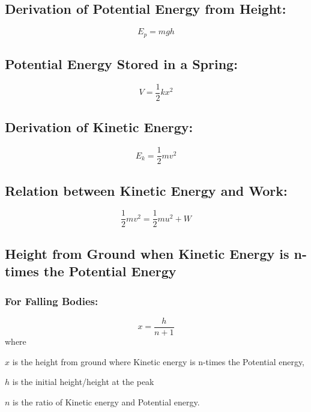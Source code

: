 \documentclass[a4paper]{report}
\begin{document}
        \subsection{Derivation of Potential Energy from Height: }
            \begin{equation}
                E_p = mgh
            \end{equation}
        \subsection{Potential Energy Stored in a Spring: }
            \begin{equation}
                V = \frac{1}{2} kx^2
            \end{equation}
        \subsection{Derivation of Kinetic Energy: }
            \begin{equation}
                E_k = \frac{1}{2}mv^2
            \end{equation}
        \subsection{Relation between Kinetic Energy and Work: }
            \begin{equation}
                \frac{1}{2} mv^2 = \frac{1}{2} mu^2 + W
            \end{equation}
        \subsection{Height from Ground when Kinetic Energy is n-times the Potential Energy}  
            \subsubsection{For Falling Bodies:}
                \begin{equation}
                    x = \frac{h}{n + 1}
                \end{equation}
                where 
                \begin{description}
                    \item $x$ is the height from ground where Kinetic energy is n-times the Potential energy,
                    \item $h$ is the initial height/height at the peak
                    \item $n$ is the ratio of Kinetic energy and Potential energy.
                \end{description}
\end{document}
